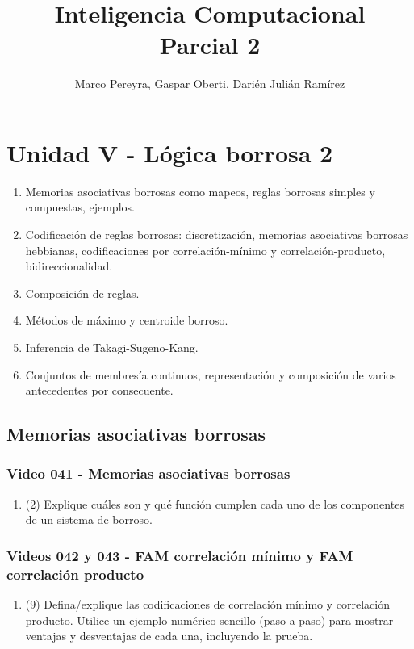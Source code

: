\documentclass[a4paper,10pt,spanish]{article}
\title{\Huge Inteligencia Computacional \\ Parcial 2} %
\author{Marco Pereyra, Gaspar Oberti, Darién Julián Ramírez} %
\date{\empty} %
\begin{document}
\maketitle %

\tableofcontents %

\newpage

\section{Unidad V - Lógica borrosa 2}

\begin{enumerate}
\item Memorias asociativas borrosas como mapeos, reglas borrosas simples y compuestas, ejemplos.
\item Codificación de reglas borrosas: discretización, memorias asociativas borrosas hebbianas, codificaciones por correlación-mínimo y correlación-producto, bidireccionalidad.
\item Composición de reglas.
\item Métodos de máximo y centroide borroso.
\item Inferencia de Takagi-Sugeno-Kang.
\item Conjuntos de membresía continuos, representación y composición de varios antecedentes por consecuente.
\end{enumerate}

\subsection{Memorias asociativas borrosas}

\subsubsection{Video 041 - Memorias asociativas borrosas}

\begin{enumerate}
\item (2) Explique cuáles son y qué función cumplen cada uno de los componentes de un sistema de borroso.
\end{enumerate}

\subsubsection{Videos 042 y 043 - FAM correlación mínimo y FAM correlación producto}

\begin{enumerate}
\item (9) Defina/explique las codificaciones de correlación mínimo y correlación producto. Utilice un ejemplo numérico sencillo (paso a paso) para mostrar ventajas y desventajas de cada una, incluyendo la prueba.
\end{enumerate}
\end{document}
